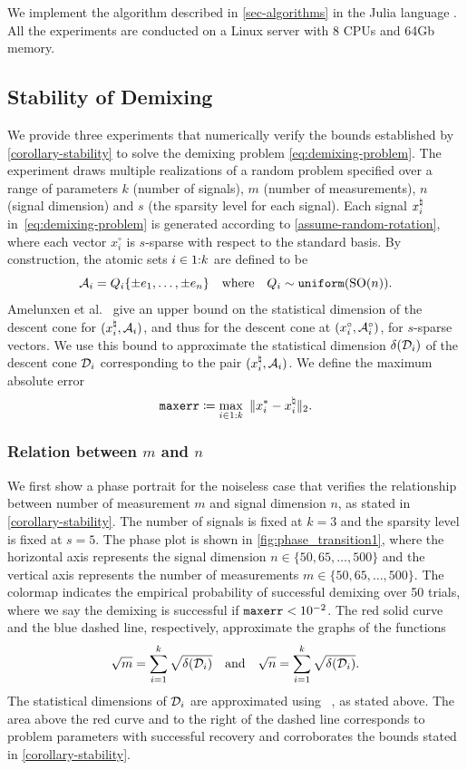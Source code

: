 We implement the algorithm described in \autoref{sec-algorithms} in the Julia language \cite{BEKS14}. All the experiments are conducted on a Linux server with 8 CPUs and 64Gb memory.

\subsection{Stability of Demixing} \label{sec:6.1}

We provide three experiments that numerically verify the bounds established by \autoref{corollary-stability} to solve the demixing problem \eqref{eq:demixing-problem}. The experiment draws multiple realizations of a random problem specified over a range of parameters $k$ (number of signals), $m$ (number of measurements), $n$ (signal dimension) and $s$ (the sparsity level for each signal). Each signal $x_i^{\natural}$ in~\eqref{eq:demixing-problem} is generated according to \autoref{assume-random-rotation}, where each vector $x_i^\circ$ is $s$-sparse with respect to the standard basis. By construction, the atomic sets $i\in1\mathord{:}k$ are defined to be 
\[
  \mathcal{A}_i = Q_i \{\pm e_1, \dots, \pm e_n\}\hbox{\quad where\quad} Q_i\sim\operatorname{\texttt{uniform}}(\operatorname{SO}(n)).
\]
Amelunxen et al.~\cite[Proposition~4.5]{amelunxen2014living} give an upper bound on the statistical dimension of the descent cone for $(x_i^{\natural},\mathcal{A}_i)$, and thus for the descent cone at $(x_i^\circ,\mathcal{A}_i^\circ)$, for  $s$-sparse vectors. We use this bound to approximate the statistical dimension $\delta(\mathcal{D}_i)$ of the descent cone $\mathcal{D}_i$ corresponding to the pair $(x_i^{\natural},\mathcal{A}_i)$.  We define the maximum absolute error
\begin{equation} \label{eq:rela_diff}
  \mathop{\tt maxerr}\coloneqq \max_{i\in\irange1k}\ \twonorm{x_i^*-x\nai}.
\end{equation}

\subsubsection{Relation between $m$ and $n$} \label{sec:phase_transition1}
We first show a phase portrait for the noiseless case that verifies the relationship between number of measurement $m$ and signal dimension $n$, as stated in \autoref{corollary-stability}. The number of signals is fixed at $k=3$ and the sparsity level is fixed at $s=5$. The phase plot is shown in \autoref{fig:phase_transition1}, where the horizontal axis represents the signal dimension $n\in\{50, 65, \dots, 500\}$ and the vertical axis represents the number of measurements $m\in\{50, 65, \dots, 500\}$. The colormap indicates the empirical probability of successful demixing over 50 trials, where we say the demixing is successful if $\mathop{\tt maxerr} < 10^{-2}$. The red solid curve and the blue dashed line, respectively, approximate the graphs of the functions
\[\sqrt{m} = \sum_{i=1}^k \sqrt{\delta(\mathcal{D}_i)}\hbox{\quad and\quad}\sqrt{n} = \sum_{i=1}^k \sqrt{\delta(\mathcal{D}_i)}.\]
The statistical dimensions of $\mathcal{D}_i$ are approximated using ~\cite[Proposition~4.5]{amelunxen2014living}, as stated above. The area above the red curve and to the right of the dashed line corresponds to problem parameters with successful recovery and corroborates the bounds stated in \autoref{corollary-stability}.


